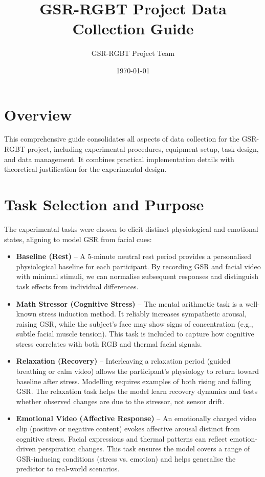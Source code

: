 \documentclass{article}
\begin{document}
\title{GSR-RGBT Project Data Collection Guide}
\author{GSR-RGBT Project Team}
\date{\today}
\maketitle

\tableofcontents

\section{Overview}

This comprehensive guide consolidates all aspects of data collection for the GSR-RGBT project, including experimental procedures, equipment setup, task design, and data management. It combines practical implementation details with theoretical justification for the experimental design.

\section{Task Selection and Purpose}

The experimental tasks were chosen to elicit distinct physiological and emotional states, aligning to model GSR from facial cues:

\begin{itemize}
    \item \textbf{Baseline (Rest)} -- A 5-minute neutral rest period provides a personalised physiological baseline for each participant. By recording GSR and facial video with minimal stimuli, we can normalise subsequent responses and distinguish task effects from individual differences.
    \item \textbf{Math Stressor (Cognitive Stress)} -- The mental arithmetic task is a well-known stress induction method. It reliably increases sympathetic arousal, raising GSR, while the subject's face may show signs of concentration (e.g., subtle facial muscle tension). This task is included to capture how cognitive stress correlates with both RGB and thermal facial signals.
    \item \textbf{Relaxation (Recovery)} -- Interleaving a relaxation period (guided breathing or calm video) allows the participant's physiology to return toward baseline after stress. Modelling requires examples of both rising and falling GSR. The relaxation task helps the model learn recovery dynamics and tests whether observed changes are due to the stressor, not sensor drift.
    \item \textbf{Emotional Video (Affective Response)} -- An emotionally charged video clip (positive or negative content) evokes affective arousal distinct from cognitive stress. Facial expressions and thermal patterns can reflect emotion-driven perspiration changes. This task ensures the model covers a range of GSR-inducing conditions (stress vs. emotion) and helps generalise the predictor to real-world scenarios.
\end{itemize}
\end{document}
